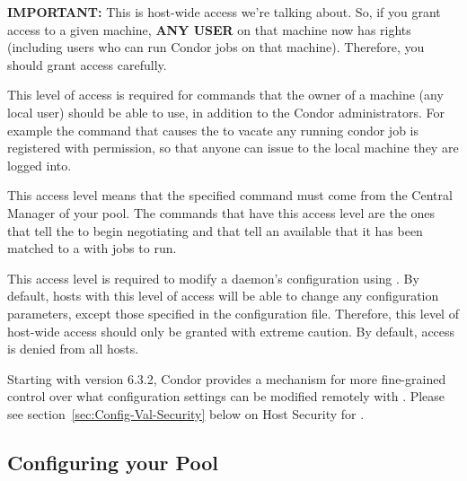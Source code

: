 \begin{description}
   \textbf{IMPORTANT:} This is host-wide access we're talking about.
   So, if you grant  access to a given machine,
   \textbf{ANY USER} on that machine now has 
   rights (including users who can run Condor jobs on that machine).
   Therefore, you should grant  access carefully.

\item[\DCPerm{OWNER}] \label{dcperm:owner} This level of access is
   required for commands that the owner of a machine (any local user)
   should be able to use, in addition to the Condor administrators.
   For example the  command that causes the
    to vacate any running condor job is registered with
    permission, so that anyone can issue 
   to the local machine they are logged into.

\item[\DCPerm{NEGOTIATOR}] \label{dcperm:negotiator} This 
   access level means that the specified command must come from the
   Central Manager of your pool.  The commands that have this access
   level are the ones that tell the  to begin
   negotiating and that tell an available  that it has
   been matched to a  with jobs to run.

\item[\DCPerm{CONFIG}] \label{dcperm:config} This access level is
   required to modify a daemon's configuration using
   .  By default, hosts with this level of access
   will be able 
   to change any configuration parameters, except those specified in
   the  configuration file.  Therefore, this
   level of host-wide access should only be granted with extreme
   caution.  By default,  access is denied from all
   hosts.

   Starting with version 6.3.2, Condor provides a mechanism for more
   fine-grained control over what configuration settings can be
   modified remotely with .  
   Please see section~\ref{sec:Config-Val-Security} below on Host
   Security for .

\end{description}

\subsection{\label{sec:Config-DCPerms}Configuring your Pool}

